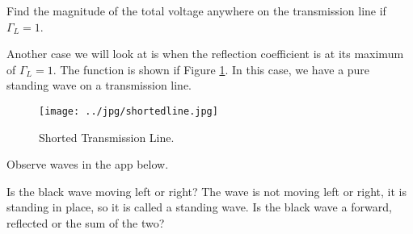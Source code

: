 \documentclass{ximera}
\begin{document}
\begin{example}

Find the magnitude of the total voltage anywhere on the transmission line if $\Gamma_L=1$.

\begin{explanation}
Another case we will look at is when 
the reflection coefficient is at its maximum of $\Gamma_L =1$. The
function is shown if Figure \ref{fig:SWStanding}. In this case, we have a pure standing wave on a transmission line.


\begin{figure}[htbp]
\begin{center}
\texttt{[image: ../jpg/shortedline.jpg]}
\end{center}
\caption{Shorted Transmission Line.}
\label{fig:SWStanding}
\end{figure}

\end{explanation}
\end{example}

\begin{question}

Observe waves in the app below. 


\begin{center}  
\end{center} 


Is the black wave moving left or right? The wave is not moving left or right, it is standing in place, so it is called a standing wave. Is the black wave a forward, reflected or the sum of the two?
\begin{multipleChoice}  
\end{multipleChoice}  

\end{question}
\end{document}
